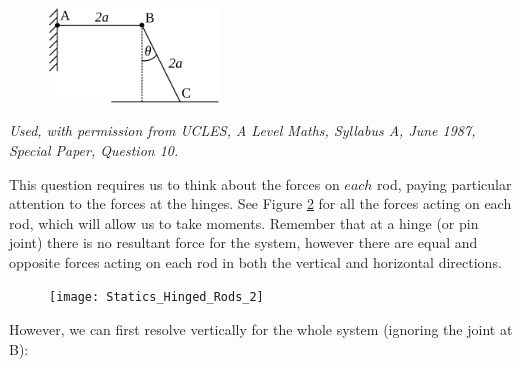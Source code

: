 
\begin{problem}[A1987MsQ10p]%
{
	
\begin{figure}[h]
	\centering
	\includegraphics[width=0.4\textwidth]{../../../figures/Statics_Hinged_Rods_1.svg}
	\caption{}	
	\label{fig:Statics_Hinged_Rods_1}
\end{figure}
	
}
{\textit{Used, with permission from UCLES, A Level Maths, Syllabus A, June 1987, Special Paper, Question 10.}}
{\answer{}
This question requires us to think about the forces on $each$ rod, paying particular attention to the forces at the hinges. See Figure \ref{fig:Statics_Hinged_Rods_2} for all the forces acting on each rod, which will allow us to take moments. Remember that at a hinge (or pin joint) there is no resultant force for the system, however there are equal and opposite forces acting on each rod in both the vertical and horizontal directions. 

\begin{figure}[h]
	\centering
	\texttt{[image: Statics\_Hinged\_Rods\_2]}
	\caption{}	
	\label{fig:Statics_Hinged_Rods_2}
\end{figure}

However, we can first resolve vertically for the whole system (ignoring the joint at B):

}
\end{problem}
